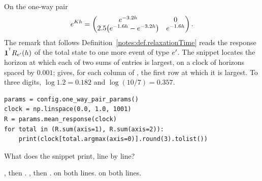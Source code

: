 \begin{question}
\label{question.peakOfTheTotalMeanResponse}
On the one-way pair
\begin{equation*}
 e^{K h} = \begin{pmatrix}
  e^{-3.2h} & 0 \\
  2.5\big(e^{-1.6h} - e^{-3.2h}\big) & e^{-1.6h}
 \end{pmatrix} .
\end{equation*}
The remark that follows Definition~\ref{notes:def.relaxationTime}
reads the response $\mathbf{1}^{^{\mathsf{T}}} R_{e^{\prime}}(h)$ of the total state
to one more event of type $e^{\prime}$.
The snippet locates the horizon at which each of two sums of entries is largest,
on a clock of horizons spaced by $0.001$;
 gives, for each column of ,
the first row at which it is largest.
To three digits, $\log 1.2 = 0.182$ and $\log(10/7) = 0.357$.
\begin{lstlisting}[caption={The peaks of two sums}, label=listing.peakOfTheTotalMeanResponse]
params = config.one_way_pair_params()
clock = np.linspace(0.0, 1.0, 1001)
R = params.mean_response(clock)
for total in (R.sum(axis=1), R.sum(axis=2)):
    print(clock[total.argmax(axis=0)].round(3).tolist())
\end{lstlisting}
What does the snippet print, line by line?
\begin{choices}
 \choice \codehl{[0.0, 0.223]}, then \codehl{[0.114, 0.0]}.
 \correctchoice \codehl{[0.114, 0.0]}, then \codehl{[0.0, 0.223]}.
 \choice \codehl{[0.0, 0.0]} on both lines.
 \choice \codehl{[0.114, 0.0]} on both lines.
\end{choices}
\end{question}


